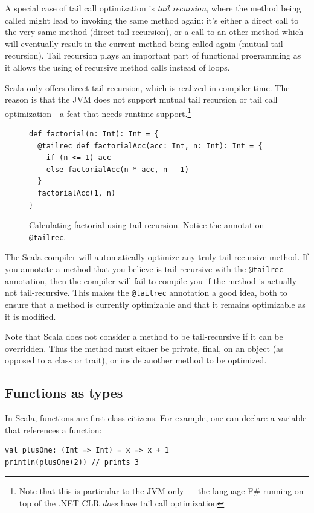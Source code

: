 A special case of tail call optimization is \emph{tail recursion}, where the method being called might lead to invoking the same method again: it's either a direct call to the very same method (direct tail recursion), or a call to an other method which will eventually result in the current method being called again (mutual tail recursion). Tail recursion plays an important part of functional programming as it allows the using of recursive method calls instead of loops.

Scala only offers direct tail recursion, which is realized in compiler-time. The reason is that the JVM does not support mutual tail recursion or tail call optimization - a feat that needs runtime support.\footnote{Note that this is particular to the JVM only --- the language F\# running on top of the .NET CLR \emph{does} have tail call optimization}

\begin{figure}[h!] 
\begin{lstlisting}
def factorial(n: Int): Int = {
  @tailrec def factorialAcc(acc: Int, n: Int): Int = {
    if (n <= 1) acc
    else factorialAcc(n * acc, n - 1)
  }
  factorialAcc(1, n)
}
\end{lstlisting}
\caption{Calculating factorial using tail recursion. Notice the annotation \texttt{@tailrec}.}
\label{fig:example_scala_tailrec}
\end{figure}

The Scala compiler will automatically optimize any truly tail-recursive method. If you annotate a method that you believe is tail-recursive with the \texttt{@tailrec} annotation, then the compiler will fail to compile you if the method is actually not tail-recursive. This makes the \texttt{@tailrec} annotation a good idea, both to ensure that a method is currently optimizable and that it remains optimizable as it is modified.

Note that Scala does not consider a method to be tail-recursive if it can be overridden. Thus the method must either be private, final, on an object (as opposed to a class or trait), or inside another method to be optimized.

\subsection{Functions as types}

In Scala, functions are first-class citizens. For example, one can declare a variable that references a function:
\begin{lstlisting}
val plusOne: (Int => Int) = x => x + 1
println(plusOne(2)) // prints 3
\end{lstlisting}

